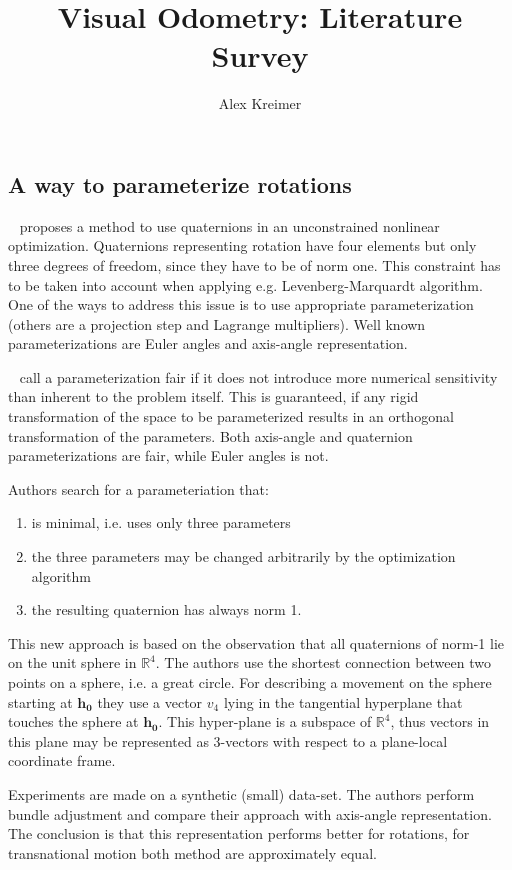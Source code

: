 \documentclass[10pt]{article}         %
\title{Visual Odometry: Literature Survey}
\author{Alex Kreimer}
\begin{document}
\maketitle

\begin{abstract}
\end{abstract}

\subsection{A way to parameterize rotations}
~\cite{schmidt2001using} proposes a method to use quaternions in an
unconstrained nonlinear optimization.  Quaternions representing
rotation have four elements but only three degrees of freedom, since
they have to be of norm one.  This constraint has to be taken into
account when applying e.g. Levenberg-Marquardt algorithm.  One of the
ways to address this issue is to use appropriate parameterization
(others are a projection step and Lagrange multipliers). Well known
parameterizations are Euler angles and axis-angle representation.

~\cite{hornegger1999representation} call a parameterization fair if it
does not introduce more numerical sensitivity than inherent to the
problem itself.  This is guaranteed, if any rigid transformation of
the space to be parameterized results in an orthogonal transformation
of the parameters.  Both axis-angle and quaternion parameterizations
are fair, while Euler angles is not.

Authors search for a parameteriation that:
\begin{enumerate}
\item is minimal, i.e. uses only three parameters
\item the three parameters may be changed arbitrarily by the optimization algorithm
\item the resulting quaternion has always norm 1.
\end{enumerate}

This new approach is based on the observation that all quaternions of
norm-1 lie on the unit sphere in $\mathbb{R}^4$.  The authors use the
shortest connection between two points on a sphere, i.e. a great
circle.  For describing a movement on the sphere starting at
$\mathbf{h_0}$ they use a vector $v_4$ lying in the tangential
hyperplane that touches the sphere at $\mathbf{h_0}$. This hyper-plane
is a subspace of $\mathbb{R}^4$, thus vectors in this plane may be
represented as 3-vectors with respect to a plane-local coordinate
frame.

Experiments are made on a synthetic (small) data-set.  The authors
perform bundle adjustment and compare their approach with axis-angle
representation.  The conclusion is that this representation performs
better for rotations, for transnational motion both method are
approximately equal.

{}

\end{document}
